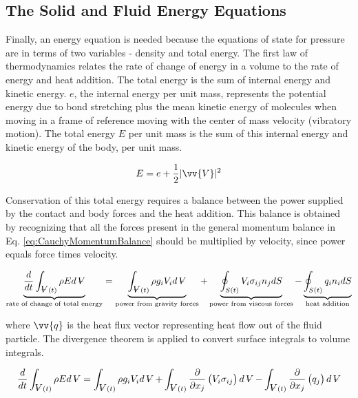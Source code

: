 \documentclass[10pt]{article}
\newcommand{\volume}{\mathop{\ooalign{\hfil$V$\hfil\cr\kern0.08em--\hfil\cr}}\nolimits}
\numberwithin{equation}{section} %
\begin{document}
\subsection{The Solid and Fluid Energy Equations}
\label{sec:EnergyEquations}

Finally, an energy equation is needed because the equations of state for pressure are in terms of two variables - density and total energy. The first law of thermodynamics relates the rate of change of energy in a volume to the rate of energy and heat addition. The total energy is the sum of internal energy and kinetic energy. \(e\), the internal energy per unit mass, represents the potential energy due to bond stretching plus the mean kinetic energy of molecules when moving in a frame of reference moving with the center of mass velocity (vibratory motion). The total energy \(E\) per unit mass is the sum of this internal energy and kinetic energy of the body, per unit mass.

\begin{equation}
\label{eq:TotalEnergy}
E=e+\frac{1}{2}|\vv{V}|^2
\end{equation}

Conservation of this total energy requires a balance between the power supplied by the contact and body forces and the heat addition. This balance is obtained by recognizing that all the forces present in the general momentum balance in Eq. \eqref{eq:CauchyMomentumBalance} should be multiplied by velocity, since power equals force times velocity.

\begin{equation}
\label{eq:EnergyBalance1}
\underbrace{\frac{d}{dt}\int_{\volume(t)}^{}\rho Ed\volume}_\text{rate of change of total energy}=\underbrace{\int_{\volume(t)}^{}\rho g_iV_id\volume}_\text{power from gravity forces}+\underbrace{\oint_{S(t)}^{}V_i\sigma_{ij}n_jdS}_\text{power from viscous forces}-\underbrace{\oint_{S(t)}^{}q_in_idS}_\text{heat addition}
\end{equation}

where \(\vv{q}\) is the heat flux vector representing heat flow out of the fluid particle. The divergence theorem is applied to convert surface integrals to volume integrals.

\begin{equation}
\label{eq:EnergyBalance}
\frac{d}{dt}\int_{\volume(t)}^{}\rho Ed\volume=\int_{\volume(t)}^{}\rho g_iV_id\volume+\int_{\volume(t)}^{}\frac{\partial}{\partial x_j}\left(V_i\sigma_{ij}\right)d\volume-\int_{\volume(t)}^{}\frac{\partial}{\partial x_j}\left(q_j\right)d\volume
\end{equation}
\end{document}
